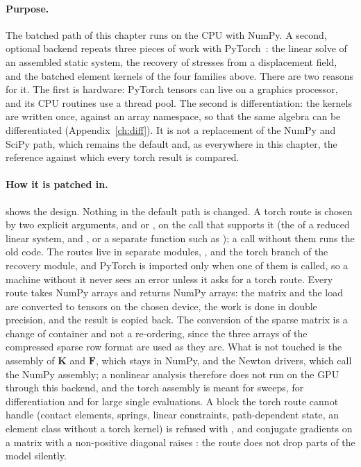 \paragraph{Purpose.} The batched path of this chapter runs on the CPU with NumPy. A second, optional backend repeats three pieces of work with PyTorch~\cite{paszke2019pytorch}: the linear solve of an assembled static system, the recovery of stresses from a displacement field, and the batched element kernels of the four families above. There are two reasons for it. The first is hardware: PyTorch tensors can live on a graphics processor, and its CPU routines use a thread pool. The second is differentiation: the kernels are written once, against an array namespace, so that the same algebra can be differentiated (Appendix~\ref{ch:diff}). It is not a replacement of the NumPy and SciPy path, which remains the default and, as everywhere in this chapter, the reference against which every torch result is compared.

\paragraph{How it is patched in.}  shows the design. Nothing in the default path is changed. A torch route is chosen by two explicit arguments,  and  or , on the call that supports it (the  of a reduced linear system,  and , or a separate function such as ); a call without them runs the old code. The routes live in separate modules, ,  and the torch branch of the recovery module, and PyTorch is imported only when one of them is called, so a machine without it never sees an error unless it asks for a torch route. Every route takes NumPy arrays and returns NumPy arrays: the matrix and the load are converted to tensors on the chosen device, the work is done in double precision, and the result is copied back. The conversion of the sparse matrix is a change of container and not a re-ordering, since the three arrays of the compressed sparse row format are used as they are. What is not touched is the assembly of $\bm K$ and $\bm F$, which stays in NumPy, and the Newton drivers, which call the NumPy assembly; a nonlinear analysis therefore does not run on the GPU through this backend, and the torch assembly is meant for sweeps, for differentiation and for large single evaluations. A block the torch route cannot handle (contact elements, springs, linear constraints, path-dependent state, an element class without a torch kernel) is refused with , and conjugate gradients on a matrix with a non-positive diagonal raises : the route does not drop parts of the model silently.

